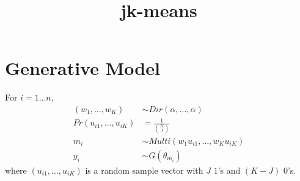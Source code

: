 \documentclass[12pt]{article}
\title
    {{jk-means}}
\date{}
\begin{document}
    
\maketitle

\section{Generative Model}

For $i=1\ldots n$, 
\begin{equation}
\begin{aligned}
(w_{1},\ldots,w_{K}) & \sim Dir(\alpha,\ldots,\alpha)\\
Pr(u_{i1},\ldots,u_{iK}) & = \frac{1}{\binom{K}{J}} \\
m_i& \sim Multi(w_1 u_{i1},\ldots,w_K u_{iK})\\
y_i& \sim G(\theta_{m_i})
\end{aligned}
\end{equation}
where $(u_{i1},\ldots,u_{iK})$ is a random sample vector with $J$ $1$'s and $(K-J)$ 0's.



\end{document}

